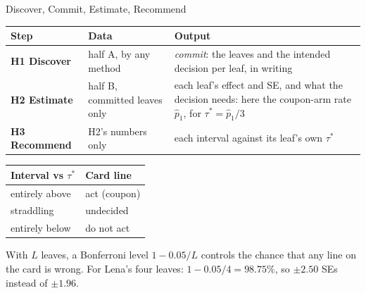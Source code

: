 \documentclass[aspectratio=169, 11pt, handout]{beamer}
\begin{document}
\begin{frame}{Discover, Commit, Estimate, Recommend}

\begin{center}
\small
\begin{tabular}{lp{4.6cm}p{6.0cm}}
\toprule
\textbf{Step} & \textbf{Data} & \textbf{Output} \\
\midrule
\textbf{H1 Discover} & half A, by any method & \emph{commit}: the leaves and the intended decision per leaf, in writing \\[0.3em]
\textbf{H2 Estimate} & half B, committed leaves only & each leaf's effect and SE, and what the decision needs: here the coupon-arm rate $\hat p_1$, for $\tau^\ast = \hat p_1/3$ \\[0.3em]
\textbf{H3 Recommend} & H2's numbers only & each interval against its leaf's own $\tau^\ast$ \\
\bottomrule
\end{tabular}
\end{center}

\medskip

\begin{center}
\small
\begin{tabular}{ll}
\toprule
\textbf{Interval vs $\tau^\ast$} & \textbf{Card line} \\
\midrule
entirely above & act (coupon) \\
straddling & undecided \\
entirely below & do not act \\
\bottomrule
\end{tabular}
\end{center}

\medskip

With $L$ leaves, a Bonferroni level $1 - 0.05/L$ controls the chance that any line on the card is wrong. For Lena's four leaves: $1 - 0.05/4 = 98.75\%$, so $\pm 2.50$ SEs instead of $\pm 1.96$.
\end{frame}
\end{document}
